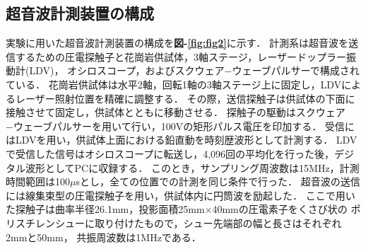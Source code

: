 \subsection{超音波計測装置の構成}
実験に用いた超音波計測装置の構成を{\bf 図-\ref{fig:fig2}}に示す．
計測系は超音波を送信するための圧電探触子と花崗岩供試体，3軸ステージ，レーザードップラー振動計(LDV)，
オシロスコープ，およびスクウェア−ウェーブパルサーで構成されている．
花崗岩供試体は水平2軸，回転1軸の3軸ステージ上に固定し，LDVによるレーザー照射位置を精確に調整する．
その際，送信探触子は供試体の下面に接触させて固定し，供試体とともに移動させる．
探触子の駆動はスクウェア−ウェーブパルサーを用いて行い，100Vの矩形パルス電圧を印加する．
受信にはLDVを用い，供試体上面における鉛直動を時刻歴波形として計測する．
LDVで受信した信号はオシロスコープに転送し，4,096回の平均化を行った後，デジタル波形としてPCに収録する．
このとき，サンプリング周波数は15MHz，計測時間範囲は100$\mu$sとし，全ての位置での計測を同じ条件で行った．
超音波の送信には線集束型の圧電探触子を用い，供試体内に円筒波を励起した．
ここで用いた探触子は曲率半径26.1mm，投影面積25mm×40mmの圧電素子をくさび状の
ポリスチレンシューに取り付けたもので，シュー先端部の幅と長さはそれぞれ2mmと50mm，
共振周波数は1MHzである\cite{Kimoto}．
